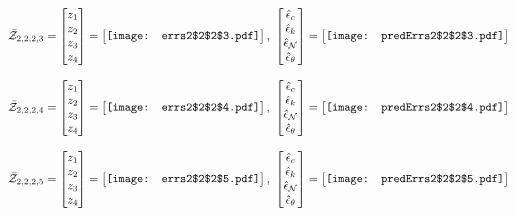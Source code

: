 \documentclass[12pt]{article}
\begin{document}
\begin{gather*}
\bar{\mathcal{Z}}_{2,2,2,3}=\begin{bmatrix}
z_1\\
z_2\\
z_3\\
z_4
 \end{bmatrix}= \begin{bmatrix}
\vcenter{\hbox{\texttt{[image: errs2\$2\$2\$3.pdf]}}}
 \end{bmatrix},\,\, \begin{bmatrix}
\hat{\epsilon}_c\\\hat{\epsilon}_k\\\hat{\epsilon}_\mathcal{N}\\\hat{\epsilon}_\theta
 \end{bmatrix}=\begin{bmatrix}
\vcenter{\hbox{\texttt{[image: predErrs2\$2\$2\$3.pdf]}}}
 \end{bmatrix}
\end{gather*}


\begin{gather*}
\bar{\mathcal{Z}}_{2,2,2,4}=\begin{bmatrix}
z_1\\
z_2\\
z_3\\
z_4
 \end{bmatrix}= \begin{bmatrix}
\vcenter{\hbox{\texttt{[image: errs2\$2\$2\$4.pdf]}}}
 \end{bmatrix},\,\, \begin{bmatrix}
\hat{\epsilon}_c\\\hat{\epsilon}_k\\\hat{\epsilon}_\mathcal{N}\\\hat{\epsilon}_\theta
 \end{bmatrix}=\begin{bmatrix}
\vcenter{\hbox{\texttt{[image: predErrs2\$2\$2\$4.pdf]}}}
 \end{bmatrix}
\end{gather*}

\begin{gather*}
\bar{\mathcal{Z}}_{2,2,2,5}=\begin{bmatrix}
z_1\\
z_2\\
z_3\\
z_4
 \end{bmatrix}= \begin{bmatrix}
\vcenter{\hbox{\texttt{[image: errs2\$2\$2\$5.pdf]}}}
 \end{bmatrix},\,\, \begin{bmatrix}
\hat{\epsilon}_c\\\hat{\epsilon}_k\\\hat{\epsilon}_\mathcal{N}\\\hat{\epsilon}_\theta
 \end{bmatrix}=\begin{bmatrix}
\vcenter{\hbox{\texttt{[image: predErrs2\$2\$2\$5.pdf]}}}
 \end{bmatrix}
\end{gather*}
\end{document}
